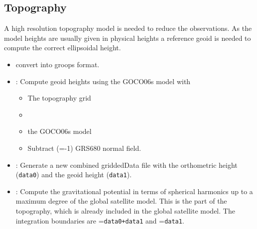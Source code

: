 \subsection{Topography}
A high resolution topography model is needed to reduce the observations.
As the model heights are usually given in physical heights a reference geoid is needed to compute the correct ellipsoidal height.
\begin{itemize}
  \item {} convert into groops format.
  \item {}: Compute geoid heights using the GOCO06s model with
  \begin{itemize}
    \item {} The topography grid
    \item {}
    \item {} the GOCO06s model
    \item {}
    Subtract (=-1) GRS680 normal field.
  \end{itemize}
  \item {}: Generate a new combined griddedData file
        with the orthometric height (\verb|data0|) and the geoid height (\verb|data1|).
  \item {}: Compute the gravitational potential in terms
        of spherical harmonics up to a maximum degree of the global satellite model.
        This is the part of the topography, which is already included in the global satellite model.
        The integration boundaries are =\verb|data0+data1|
        and =\verb|data1|.
\end{itemize}


